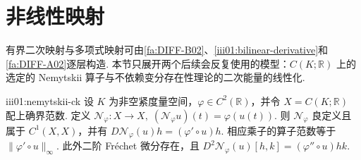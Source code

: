\section{非线性映射}\label{sec:iii01-nonlinear-maps}

有界二次映射与多项式映射可由\autoref{fa:DIFF-B02}、\autoref{iii01:bilinear-derivative}和\autoref{fa:DIFF-A02}逐层构造. 本节只展开两个后续会反复使用的模型：\(\displaystyle C(K;\mathbb R)\) 上的选定的 Nemytskii 算子与不依赖变分存在性理论的二次能量的线性化.

\begin{FATheorem}{iii01:nemytskii-ck}
设 \(\displaystyle K\) 为非空紧度量空间，\(\displaystyle\varphi\in C^2(\mathbb R)\)，并令 \(\displaystyle X=C(K;\mathbb R)\) 配上确界范数. 定义
\(\displaystyle \mathcal N_{\varphi}:X\to X, \; (\mathcal N_{\varphi}u)(t)=\varphi(u(t)).\)
则 \(\displaystyle\mathcal N_{\varphi}\) 良定义且属于 \(\displaystyle C^1(X,X)\)，并有
\(\displaystyle D\mathcal N_{\varphi}(u)h = (\varphi'\circ u)h.\)
相应乘子的算子范数等于 \(\displaystyle\|\varphi'\circ u\|_{\infty}\). 此外二阶 Fréchet 微分存在，且
\(\displaystyle D^2\mathcal N_{\varphi}(u)[h,k] = (\varphi''\circ u)hk.\)
\end{FATheorem}

